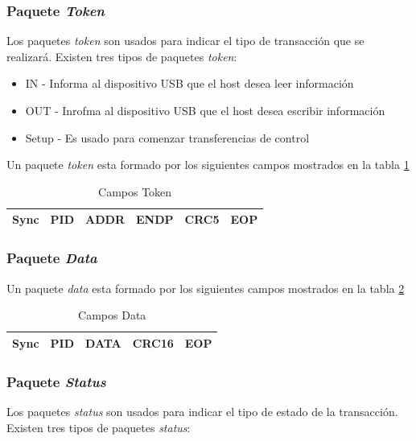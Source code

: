 \subsubsection{Paquete \emph{Token}}
Los paquetes \emph{token} son usados para indicar el tipo de transacci\'on que
se realizar\'a. Existen tres tipos de paquetes \emph{token}:

\begin{itemize}
 \item IN - Informa al dispositivo USB que el host desea leer informaci\'on
 \item OUT - Inrofma al dispositivo USB que el host desea escribir
informaci\'on
 \item Setup - Es usado para comenzar transferencias de control
\end{itemize}

Un paquete \emph{token} esta formado por los siguientes campos mostrados en la
tabla \ref{tab:usb_token_fields}


\begin{table}[ht]
\centering
\begin{tabular}{|c|c|c|c|c|c|} \hline
Sync & PID & ADDR & ENDP & CRC5 & EOP\\ \hline
\end{tabular}
\caption{Campos Token} 
\label{tab:usb_token_fields}
\end{table}


\subsubsection{Paquete \emph{Data}}
Un paquete \emph{data} esta formado por los siguientes campos mostrados en la
tabla \ref{tab:usb_data_fields}

\begin{table}[ht]
\centering
\begin{tabular}{|c|c|c|c|c|} \hline
Sync & PID & DATA & CRC16 & EOP\\ \hline
\end{tabular}
\caption{Campos Data} 
\label{tab:usb_data_fields}
\end{table}


\subsubsection{Paquete \emph{Status}}
Los paquetes \emph{status} son usados para indicar el tipo de estado de la
transacci\'on. Existen tres tipos de paquetes \emph{status}:

